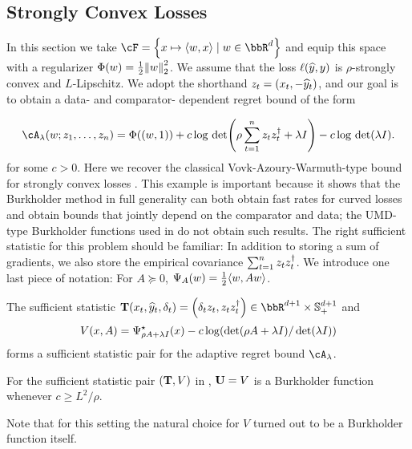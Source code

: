 \subsection{Strongly Convex Losses}
\label{sec:square_loss}
In this section we take $\cF=\crl*{x\mapsto{}\tri*{w,x}\mid{}w\in\bbR^{d}}$ and equip this space with a regularizer $\Phi(w) = \frac{1}{2}\nrm*{w}_{2}^{2}$. We assume that the loss $\ell({\widehat{y}}, y)$ is $\rho$-strongly convex and $L$-Lipschitz. We adopt the shorthand $z_t=(x_t, -{\widehat{y}}_t)$, and our goal is to obtain a data- and comparator- dependent regret bound of the form

\[
\cA_{\lambda}(w; z_{1},\ldots,z_{n}) = \Phi((w,1)) + c\log\,\det\prn*{\rho{}\sum_{t=1}^{n}z_tz_t^{\trn} + \lambda{}I} - c\log\,\det(\lambda{}I).
\]
for some $c>0$. Here we recover the classical Vovk-Azoury-Warmuth-type bound for strongly convex losses \citep{Vovk98,AzouryWarmuth01}. This example is important because it shows that the Burkholder method in full generality can both obtain fast rates for curved losses and obtain bounds that jointly depend on the comparator and data; the UMD-type Burkholder functions used in \cite{foster2017zigzag} do not obtain such results. The right sufficient statistic for this problem should be familiar: In addition to storing a sum of gradients, we also store the empirical covariance $\sum_{t=1}^{n}z_tz_t^{\dagger}$. We introduce one last piece of notation: For $A\succeq{}0$, $\Psi_{A}(w)=\frac{1}{2}\tri*{w,Aw}$.

\begin{proposition}
  \label{prop:square_loss_sufficient}
   The sufficient statistic $\suff(x_t,\pred_t,\delta_t)= \left( \delta_{t}z_t, z_tz_t^{\trn} \right)\in\bbR^{d+1}\times{}\sym^{d+1}_{+}$ and
\begin{equation}
\label{eq:vovk_azoury_warmuth_v}
V(x, A) = \Psi^{\star}_{\rho{}A + \lambda{}I}\prn*{x} - c\log\prn*{\det(\rho{}A + \lambda{}I)/\det(\lambda{}I)}
\end{equation}
forms a sufficient statistic pair for the adaptive regret bound $\cA_{\lambda}$.
\end{proposition}

\begin{theorem}
  \label{thm:square_loss_burkholder}
      For the sufficient statistic pair $(\mathbf{T}, V)$ in , $\mathbf{U}=V$ is a Burkholder function whenever $c\geq{}L^{2}/\rho$. 
\end{theorem}
Note that for this setting the natural choice for $V$ turned out to be a Burkholder function itself.


